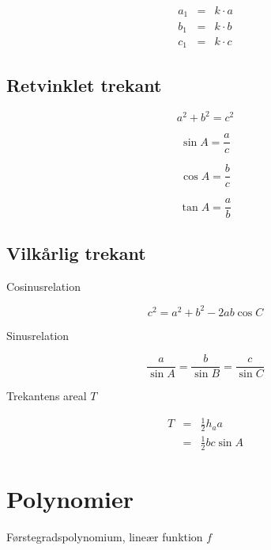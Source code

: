 \documentclass[11pt,a4paper,landscape,twocolumn,fleqn,leqno]{article}
\begin{document}
\begin{eqnarray}
a_1 & = & k \cdot a \\
b_1 & = & k \cdot b \nonumber \\
c_1 & = & k \cdot c \nonumber
\end{eqnarray}

\subsection{Retvinklet trekant}

\begin{equation}
a^2 + b^2 = c^2
\end{equation}

\begin{equation}
\sin A = \frac{a}{c}
\end{equation}

\begin{equation}
\cos A = \frac{b}{c}
\end{equation}

\begin{equation}
\tan A = \frac{a}{b}
\end{equation}

\subsection{Vilkårlig trekant}

Cosinusrelation

\begin{equation}
c^2 = a^2 + b^2 - 2ab\cos C
\end{equation}

Sinusrelation

\begin{equation}
\frac{a}{\sin A} = \frac{b}{\sin B} = \frac{c}{\sin C}
\end{equation}

Trekantens areal $T$

\begin{eqnarray}
T & = & \frac{1}{2}h_a a \\
& = & \frac{1}{2}bc\sin A \nonumber
\end{eqnarray}

\newpage

\section{Polynomier}

Førstegradspolynomium, lineær funktion $f$
\end{document}
